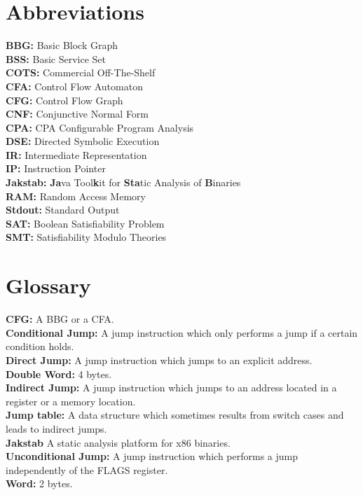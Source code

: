 \documentclass{kththesis}
\begin{document}
\section*{Abbreviations}
\textbf{BBG:} Basic Block Graph\\
\textbf{BSS:} Basic Service Set\\
\textbf{COTS:} Commercial Off-The-Shelf\\
\textbf{CFA:} Control Flow Automaton\\
\textbf{CFG:} Control Flow Graph\\
\textbf{CNF:} Conjunctive Normal Form\\
\textbf{CPA:} CPA Configurable Program Analysis \\
\textbf{DSE:} Directed Symbolic Execution\\
\textbf{IR:} Intermediate Representation\\
\textbf{IP:} Instruction Pointer\\
\textbf{Jakstab:} \textbf{Ja}va Tool\textbf{k}it for \textbf{Sta}tic Analysis of \textbf{B}inaries\\
\textbf{RAM:} Random Access Memory\\
\textbf{Stdout:} Standard Output\\
\textbf{SAT:} Boolean Satisfiability Problem\\
\textbf{SMT:} Satisfiability Modulo Theories\\

\clearpage
\thispagestyle{empty}
\section*{Glossary}
\textbf{CFG:} A BBG or a CFA.\\
\textbf{Conditional Jump:} A jump instruction which only performs a jump if a certain condition holds.\\
\textbf{Direct Jump:} A jump instruction which jumps to an explicit address.\\
\textbf{Double Word:} 4 bytes.\\
\textbf{Indirect Jump:} A jump instruction which jumps to an address located in a register or a memory location.\\
\textbf{Jump table:} A data structure which sometimes results from switch cases and leads to indirect jumps. \\
\textbf{Jakstab} A static analysis platform for x86 binaries. \\
\textbf{Unconditional Jump:} A jump instruction which performs a jump independently of the FLAGS register.\\
\textbf{Word:} 2 bytes.\\
\end{document}
